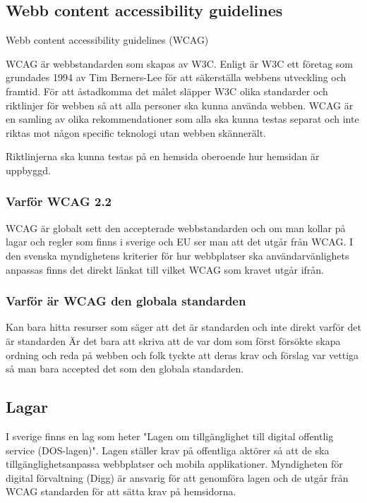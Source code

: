 \documentclass[11p]{article}
\begin{document}
    \subsection{Webb content accessibility guidelines}
    Webb content accessibility guidelines (WCAG)

    WCAG är webbstandarden som skapas av W3C.
    Enligt \textcite{W3C} är W3C ett företag som grundades 1994 av Tim Berners-Lee för att säkerställa webbens utveckling och framtid.
    För att åstadkomma det målet släpper W3C olika standarder och riktlinjer för webben så att alla personer ska kunna använda webben.
    WCAG är en samling av olika rekommendationer som alla ska kunna testas separat och inte riktas mot någon specific teknologi utan webben skännerält. \parencite{WCAG_2.0}



    Riktlinjerna ska kunna testas på en hemsida oberoende hur hemsidan är uppbyggd.

    \subsubsection{Varför WCAG 2.2}
    WCAG är globalt sett den accepterade webbstandarden och om man kollar på lagar och regler som finns i sverige och EU ser man att det utgår från WCAG.
    I den svenska myndighetens kriterier för hur webbplatser ska användarvänlighets anpassas finns det direkt länkat till vilket WCAG som kravet utgår ifrån. \parencite{Utförande_av_Dos_lagen}


    \subsubsection{Varför är WCAG den globala standarden}
    Kan bara hitta resurser som säger att det är standarden och inte direkt varför det är standarden
    Är det bara att skriva att de var dom som först försökte skapa ordning och reda på webben och folk tyckte att deras krav och förslag var vettiga så man bara accepted det som den globala standarden.

    \subsection{Lagar}
    I sverige finns en lag som heter "Lagen om tillgänglighet till digital offentlig service (DOS-lagen)".\parencite{Dos-lagen}
    Lagen ställer krav på offentliga aktörer så att de ska tillgänglighetsanpassa webbplatser och mobila applikationer.
    Myndigheten för digital förvaltning (Digg) är ansvarig för att genomföra lagen och de utgår från WCAG standarden för att sätta krav på hemsidorna.
\end{document}
